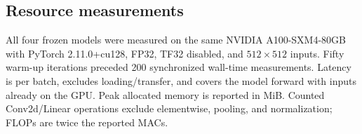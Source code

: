 \subsection{Resource measurements}
\label{sec:appendix-resources}
All four frozen models were measured on the same NVIDIA A100-SXM4-80GB with PyTorch 2.11.0+cu128, FP32, TF32 disabled, and $512\times512$ inputs. Fifty warm-up iterations preceded 200 synchronized wall-time measurements. Latency is per batch, excludes loading/transfer, and covers the model forward with inputs already on the GPU. Peak allocated memory is reported in MiB. Counted Conv2d/Linear operations exclude elementwise, pooling, and normalization; FLOPs are twice the reported MACs.
